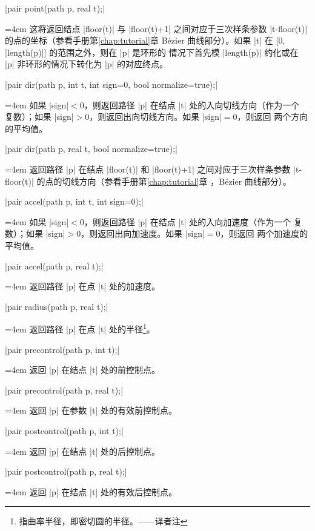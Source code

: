 \documentclass{ctexbook}
\makeatletter
\newenvironment{funclist}{\trivlist
  \parindent=0pt
\item[]
  \def\item{\medskip\par\leftskip=0pt}
  \def\go{\par\leftskip=4em}}
{\endtrivlist}
\newenvironment{typelist}{\itemize
  \let\old@item\@item
  \def\@item[##1]{\expandafter\old@item[\ttfamily\color{type!50!black}##1]}}
{\enditemize}
\newcommand\transnote[1]{\footnote{#1——译者注}}
\makeatother
\begin{document}
\begin{typelist}
\begin{funclist}
\item |pair point(path p, real t);| \go
  这将返回结点 |floor(t)| 与 |floor(t)+1| 之间对应于三次样条参数 |t-floor(t)|
  的点的坐标（参看手册第\ref{chap:tutorial}章 Bézier
  曲线部分）。如果 |t| 在 $[0,{}$|length(p)|$]$ 的范围之外，则在 |p| 是环形的
  情况下首先模 |length(p)| 约化或在 |p| 非环形的情况下转化为 |p| 的对应终点。

\item |pair dir(path p, int t, int sign=0, bool normalize=true);| \go
  如果 |sign|${}<0$，则返回路径 |p| 在结点 |t| 处的入向切线方向（作为一个
  复数）；如果 |sign|${}>0$，则返回出向切线方向。如果 |sign|${}=0$，则返回
  两个方向的平均值。

\item |pair dir(path p, real t, bool normalize=true);| \go
  返回路径 |p| 在结点 |floor(t)| 和 |floor(t)+1| 之间对应于三次样条参数
  |t-floor(t)| 的点的切线方向（参看手册第\ref{chap:tutorial}章%
  ，Bézier 曲线部分）。

\item |pair accel(path p, int t, int sign=0);| \go
  如果 |sign|${}<0$，则返回路径 |p| 在结点 |t| 处的入向加速度（作为一个
  复数）；如果 |sign|${}>0$，则返回出向加速度。如果 |sign|${}=0$，则返回
  两个加速度的平均值。

\item |pair accel(path p, real t);| \go
  返回路径 |p| 在点 |t| 处的加速度。

\item |pair radius(path p, real t);| \go
  返回路径 |p| 在点 |t| 处的半径\transnote{指曲率半径，即密切圆的半径。}。

\item |pair precontrol(path p, int t);| \go
  返回 |p| 在结点 |t| 处的前控制点。

\item |pair precontrol(path p, real t);| \go
  返回 |p| 在参数 |t| 处的有效前控制点。

\item |pair postcontrol(path p, int t);| \go
  返回 |p| 在结点 |t| 处的后控制点。

\item |pair postcontrol(path p, real t);| \go
  返回 |p| 在结点 |t| 处的有效后控制点。


\end{funclist}
\end{typelist}
\end{document}
